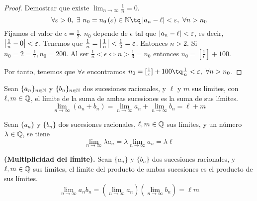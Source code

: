 {\begin{proof}
    Demostrar que existe $\lim_{n\to\infty} \frac{1}{n} = 0$.
    \begin{equation}
        \forall\epsilon > 0,\ \exists\ n_0 = n_0\left( \epsilon \right) \in\N\tq \abs{a_n - \ell} < \epsilon,\ \forall n > n_0
    \end{equation}
    Fijamos el valor de $\epsilon = \frac{1}{2}$. $n_0$ depende de $\epsilon$ tal que $\left\vert a_n - \ell \right\vert < \varepsilon$, es decir, $\left\vert \frac{1}{n} - 0 \right\vert < \varepsilon$. Tenemos que $\frac{1}{n}=\left\vert \frac{1}{n} \right\vert < \frac{1}{2} = \varepsilon$. Entonces $n > 2$. Si $n_0 = 2 = \frac{1}{\epsilon}, n_0 = 200$. Al ser $\frac{1}{n} < \epsilon\iff n > \frac{1}{3} = n_0$ entonces $n_0 = [\frac{1}{\epsilon}] + 100$.

        Por tanto, tenemos que $\forall\epsilon$ encontramos $n_0 = [\frac{1}{\epsilon}] + 100 \tq \frac{1}{n} < \epsilon,\ \forall n > n_0$.
\end{proof}

\begin{prop}
    Sean $\{a_n\}_{n\in\mathbb{N}} $ y $\{b_n\}_{n\in\mathbb{N}} $ dos sucesiones racionales, y $\ell$ y $m$ sus límites, con $\ell, m\in\mathbb{Q}$, el límite de la suma de ambas sucesiones es la suma de sus límites.
    \begin{equation}
        \lim_{n\to\infty}\left( a_n + b_n \right) = \lim_{n\to\infty}a_n + \lim_{n\to\infty}b_n = \ell + m
    \end{equation}
\end{prop}

\begin{prop}
    Sean $\{a_n\}$ y $\{b_n\} $ dos sucesiones racionales, $\ell, m\in\mathbb{Q}$ sus límites, y un número $\lambda\in\mathbb{Q}$, se tiene
    \begin{equation}
        \lim_{n\to\infty}\lambda  a_n = \lambda \lim_{n\to\infty}a_n = \lambda\ell
    \end{equation}
\end{prop}

\begin{prop}
    \textbf{(Multiplicidad del límite).} Sean $\{a_n\} $ y $\{b_n\} $ dos sucesiones racionales, y $\ell, m\in\mathbb{Q}$ sus límites, el límite del producto de ambas sucesiones es el producto de sus límites.
    \begin{equation}
    \lim_{n\to\infty}a_nb_n = \left( \lim_{n\to\infty} a_n\right) \left( \lim_{n\to\infty}b_n \right) = \ell m
    \end{equation}
\end{prop}

}
